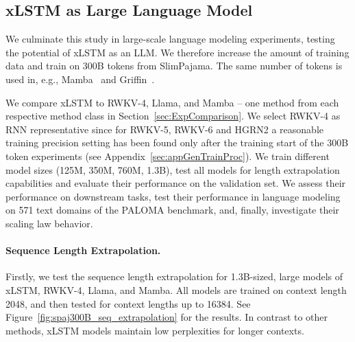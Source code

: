 \subsection{xLSTM as Large Language Model}
\label{sec:ExpLanguage}

We culminate this study in large-scale language modeling experiments, testing the potential of xLSTM as an LLM. We therefore increase the amount of training data and train on 300B tokens from SlimPajama. The same number of tokens is used in, e.g., Mamba~\citep{Gu:24arxiv} and Griffin~\citep{De:24arxiv}.

We compare xLSTM to RWKV-4, Llama, and Mamba – one method from each respective method class in Section~\ref{sec:ExpComparison}.
We select RWKV-4 as RNN representative since for RWKV-5, RWKV-6 and HGRN2 a reasonable training precision setting has been found only after the training start of the 300B token experiments (see Appendix~\ref{sec:appGenTrainProc}).
We train different model sizes (125M, 350M, 760M, 1.3B), test all models for length extrapolation capabilities and evaluate their performance on the validation set. We assess their performance on downstream tasks, test their performance in language modeling on 571 text domains of the PALOMA benchmark, and, finally, investigate their scaling law behavior.

\paragraph{Sequence Length Extrapolation.}
\label{sec:spaj300B_ctx_extrapolation}
Firstly, we test the sequence length extrapolation for 1.3B-sized, large models of xLSTM, RWKV-4, Llama, and Mamba. All models are trained on context length 2048, and then tested for context lengths up to 16384. See Figure~\ref{fig:spaj300B_seq_extrapolation} for the results. In contrast to other methods, xLSTM models maintain low perplexities for longer contexts.

